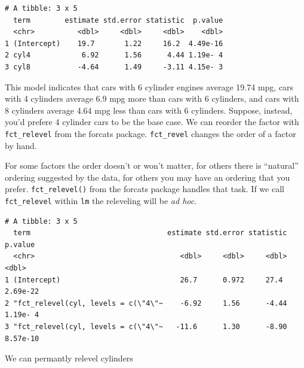 \documentclass[]{book}
\newenvironment{Shaded}{\begin{snugshade}}{\end{snugshade}}
\newcommand{\DataTypeTok}[1]{\textcolor[rgb]{0.13,0.29,0.53}{#1}}
\newcommand{\KeywordTok}[1]{\textcolor[rgb]{0.13,0.29,0.53}{\textbf{#1}}}
\newcommand{\NormalTok}[1]{#1}
\newcommand{\OperatorTok}[1]{\textcolor[rgb]{0.81,0.36,0.00}{\textbf{#1}}}
\newcommand{\StringTok}[1]{\textcolor[rgb]{0.31,0.60,0.02}{#1}}
\begin{document}
\begin{verbatim}
# A tibble: 3 x 5
  term        estimate std.error statistic  p.value
  <chr>          <dbl>     <dbl>     <dbl>    <dbl>
1 (Intercept)    19.7       1.22     16.2  4.49e-16
2 cyl4            6.92      1.56      4.44 1.19e- 4
3 cyl8           -4.64      1.49     -3.11 4.15e- 3
\end{verbatim}

This model indicates that cars with 6 cylinder engines average 19.74 mpg, cars with 4 cylinders average 6.9 mpg more than cars with 6 cylinders, and cars with 8 cylinders average 4.64 mpg less than cars with 6 cylinders. Suppose, instead, you'd prefere 4 cylinder cars to be the base case. We can reorder the factor with \texttt{fct\_relevel} from the forcats package. \texttt{fct\_revel} changes the order of a factor by hand.

For some factors the order doesn't or won't matter, for others there is ``natural'' ordering suggested by the data, for others you may have an ordering that you prefer. \texttt{fct\_relevel()} from the forcats package handles that task. If we call \texttt{fct\_relevel} within \texttt{lm} the releveling will be \emph{ad hoc}.

\begin{Shaded}
\end{Shaded}

\begin{verbatim}
# A tibble: 3 x 5
  term                                estimate std.error statistic  p.value
  <chr>                                  <dbl>     <dbl>     <dbl>    <dbl>
1 (Intercept)                            26.7      0.972     27.4  2.69e-22
2 "fct_relevel(cyl, levels = c(\"4\"~    -6.92     1.56      -4.44 1.19e- 4
3 "fct_relevel(cyl, levels = c(\"4\"~   -11.6      1.30      -8.90 8.57e-10
\end{verbatim}

We can permantly relevel cylinders
\end{document}
